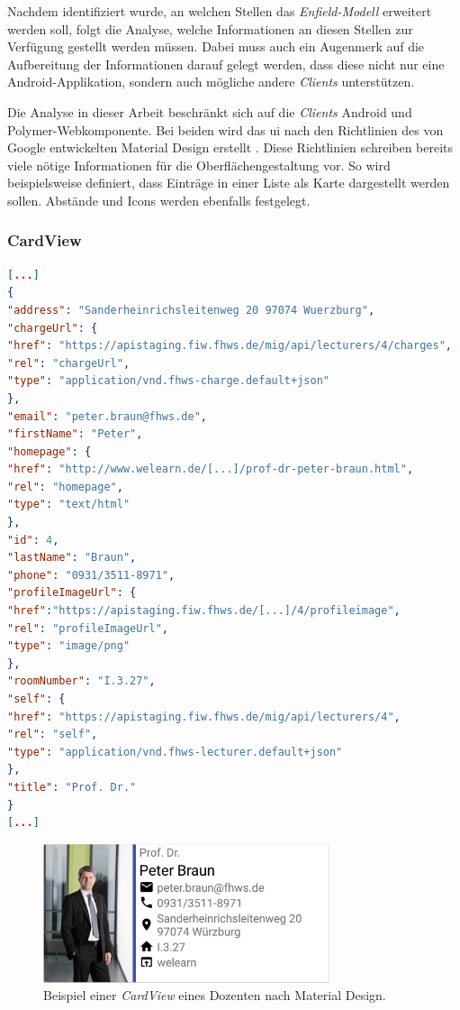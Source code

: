 Nachdem identifiziert wurde, an welchen Stellen das \textit{Enfield-Modell} erweitert werden soll, folgt die Analyse, welche Informationen an diesen Stellen zur Verfügung gestellt werden müssen. Dabei muss auch ein Augenmerk auf die Aufbereitung der Informationen darauf gelegt werden, dass diese nicht nur eine Android-Applikation, sondern auch mögliche andere \textit{Clients} unterstützen.

Die Analyse in dieser Arbeit beschränkt sich auf die \textit{Clients} Android und Polymer-Webkomponente. Bei beiden wird das \acf{ui} nach den Richtlinien des von Google entwickelten Material Design erstellt \cite{material}. Diese Richtlinien schreiben bereits viele nötige Informationen für die Oberflächengestaltung vor. So wird beispielsweise definiert, dass Einträge in einer Liste als Karte dargestellt werden sollen. Abstände und Icons werden ebenfalls festgelegt.

\subsubsection{CardView}


\begin{lstlisting}[label=lst:braun_json,
language=json,
firstnumber=1,
caption=Demo Daten eines Dozenten.]	
[...]	   
{
"address": "Sanderheinrichsleitenweg 20 97074 Wuerzburg",
"chargeUrl": {
"href": "https://apistaging.fiw.fhws.de/mig/api/lecturers/4/charges",
"rel": "chargeUrl",
"type": "application/vnd.fhws-charge.default+json"
},
"email": "peter.braun@fhws.de",
"firstName": "Peter",
"homepage": {
"href": "http://www.welearn.de/[...]/prof-dr-peter-braun.html",
"rel": "homepage",
"type": "text/html"
},
"id": 4,
"lastName": "Braun",
"phone": "0931/3511-8971",
"profileImageUrl": {
"href":"https://apistaging.fiw.fhws.de/[...]/4/profileimage",
"rel": "profileImageUrl",
"type": "image/png"
},
"roomNumber": "I.3.27",
"self": {
"href": "https://apistaging.fiw.fhws.de/mig/api/lecturers/4",
"rel": "self",
"type": "application/vnd.fhws-lecturer.default+json"
},
"title": "Prof. Dr."
}
[...]
\end{lstlisting}

\begin{figure}[H]
	\begin{center}
		\includegraphics[width=0.75\textwidth]{images/card.png}
		\caption{Beispiel einer \textit{CardView} eines Dozenten nach Material Design.}
		\label{fig:card}
	\end{center}
\end{figure}

